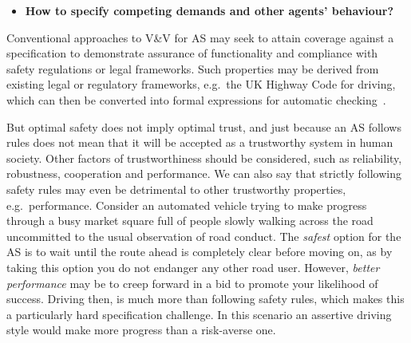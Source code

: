 \documentclass[sigconf,nonacm]{acmart}%
\begin{document}
	
	
	\begin{itemize}[leftmargin=0.5cm]
		\item \textbf{How to specify competing demands and other agents' behaviour?}
	\end{itemize}
	Conventional approaches to V\&V for AS may seek to attain coverage against a specification to demonstrate assurance of functionality and compliance with safety regulations or legal frameworks. 
	Such properties may be derived from existing legal or regulatory frameworks, e.g.\ the UK Highway Code for driving, which can then be converted into formal expressions for automatic checking~\cite{harper2021safety}.
	
	But optimal safety does not imply optimal trust, and just because an AS follows rules does not mean that it will be accepted as a trustworthy system in human society. Other factors of trustworthiness should be considered, such as reliability, robustness, cooperation and performance. 
	We can also say that strictly following safety rules may even be detrimental to other trustworthy properties, e.g.\ performance. 
	Consider an automated vehicle trying to make progress through a busy market square full of people slowly walking across the road uncommitted to the usual observation of road conduct. 
	The \emph{safest} option for the AS is to wait until the route ahead is completely clear before moving on, as by taking this option you do not endanger any other road user. However, \emph{better performance} may be to creep forward in a bid to promote your likelihood of success.
	Driving then, is much more than following safety rules, which makes this a particularly hard specification challenge. In this scenario an assertive driving style would make more progress than a risk-averse one. 
	
\end{document}
